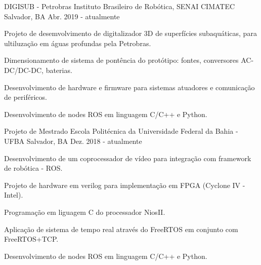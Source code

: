 

\begin{cventries}

  \cventry
    {DIGISUB - Petrobras} %
    {Instituto Brasileiro de Robótica, SENAI CIMATEC} %
    {Salvador, BA} %
    {Abr. 2019 - atualmente} %
    {
      \begin{cvitems} %
        \item {Projeto de desemvolvimento de digitalizador 3D de superfícies subaquáticas, para ultiluzação em águas profundas pela Petrobras.}
        \item {Dimensionamento de sistema de pontência do protótipo: fontes, conversores AC-DC/DC-DC, baterias.}
        \item {Desenvolvimento de hardware e firmware para sistemas atuadores e comunicação de periféricos.}
        \item {Desenvolvimento de nodes ROS em linguagem C/C++ e Python.}
      \end{cvitems}
    }


  \cventry
    {Projeto de Mestrado} %
    {Escola Politécnica da Universidade Federal da Bahia - UFBA} %
    {Salvador, BA} %
    {Dez. 2018 - atualmente} %
    {
      \begin{cvitems} %
        \item {Desenvolvimento de um coprocessador de vídeo para integração com framework de robótica - ROS.}
        \item {Projeto de hardware em verilog para implementação em FPGA (Cyclone IV - Intel).}
        \item {Programação em liguagem C do processador NiosII.}
        \item {Aplicação de sistema de tempo real através do FreeRTOS em conjunto com FreeRTOS+TCP.}
        \item {Desenvolvimento de nodes ROS em linguagem C/C++ e Python.}
      \end{cvitems}
    }


\end{cventries}
